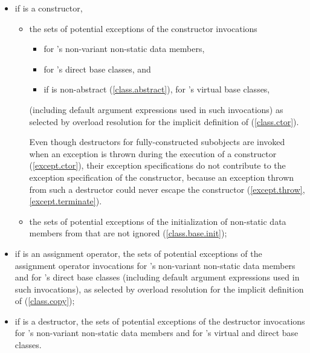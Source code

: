 \begin{itemize}
\item
if  is a constructor,
\begin{itemize}
\item
the sets of potential exceptions of the constructor invocations
\begin{itemize}
\item
for 's non-variant non-static data members,
\item
for 's direct base classes, and
\item
if  is non-abstract (\ref{class.abstract}), for 's virtual base
classes,
\end{itemize}
(including default argument expressions used in such invocations) as selected
by overload resolution for the implicit definition of  (\ref{class.ctor}).
\begin{note}
Even though destructors for fully-constructed subobjects are invoked
when an exception is thrown during the execution of a constructor (\ref{except.ctor}),
their exception specifications do not contribute to the
exception specification of the constructor, because
an exception thrown from such a destructor could never escape the constructor
(\ref{except.throw}, \ref{except.terminate}).
\end{note}
\item
the sets of potential exceptions of the initialization of non-static data members
from  that are not ignored (\ref{class.base.init});
\end{itemize}

\item
if  is an assignment operator, the sets of potential exceptions of
the assignment operator invocations for 's non-variant non-static
data members and for 's direct base classes (including default
argument expressions used in such invocations), as selected by overload resolution
for the implicit definition of  (\ref{class.copy});

\item
if  is a destructor, the sets of potential exceptions of the
destructor invocations for 's non-variant non-static data members
and for 's virtual and direct base classes.
\end{itemize}

